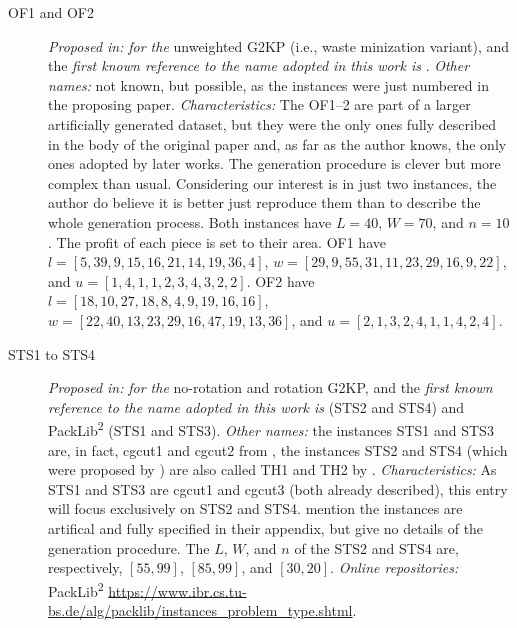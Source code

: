 \documentclass[ppgc,tese,english,formais,babel]{iiufrgs}
\begin{document}
\begin{description}
\item [OF1 and OF2] \emph{Proposed in:} \citet{oliveira:1990} \emph{for the} unweighted G2KP (i.e., waste minization variant), and the \emph{first known reference to the name adopted in this work is} \citet{hifi:2001}. \emph{Other names:} not known, but possible, as the instances were just numbered in the proposing paper. \emph{Characteristics: } The OF1--2 are part of a larger artificially generated dataset, but they were the only ones fully described in the body of the original paper and, as far as the author knows, the only ones adopted by later works. The generation procedure is clever but more complex than usual. Considering our interest is in just two instances, the author do believe it is better just reproduce them than to describe the whole generation process. Both instances have \(L = 40\), \(W = 70\), and \(n = 10\). The profit of each piece is set to their area. OF1 have \(l = [5, 39, 9, 15, 16, 21, 14, 19, 36, 4]\), \(w = [29, 9, 55, 31, 11, 23, 29, 16, 9, 22]\), and \(u = [1, 4, 1, 1, 2, 3, 4, 3, 2, 2]\). OF2 have \(l = [18, 10, 27, 18, 8, 4, 9, 19, 16, 16]\), \(w = [22, 40, 13, 23, 29, 16, 47, 19, 13, 36]\), and \(u = [2, 1, 3, 2, 4, 1, 1, 4, 2, 4]\).
\item [STS1 to STS4] \emph{Proposed in:} \citet{tschoke:1995} \emph{for the} no-rotation and rotation G2KP, and the \emph{first known reference to the name adopted in this work is} \citet{alvarez:2002:tabu} (STS2 and STS4) and PackLib\textsuperscript{2} (STS1 and STS3). \emph{Other names:} the instances STS1 and STS3 are, in fact, cgcut1 and cgcut2 from \citet{cw:1977}, the instances STS2 and STS4 (which were proposed by \citet{tschoke:1995}) are also called TH1 and TH2 by \citet{fayard:1998}. \emph{Characteristics: } As STS1 and STS3 are cgcut1 and cgcut3 (both already described), this entry will focus exclusively on STS2 and STS4. \citet{tschoke:1995} mention the instances are artifical and fully specified in their appendix, but give no details of the generation procedure. The \(L\), \(W\), and \(n\) of the STS2 and STS4 are, respectively, \([55, 99]\), \([85, 99]\), and \([30, 20]\). \emph{Online repositories:} PackLib\textsuperscript{2} \url{https://www.ibr.cs.tu-bs.de/alg/packlib/instances_problem_type.shtml}.

\end{description}
\end{document}
